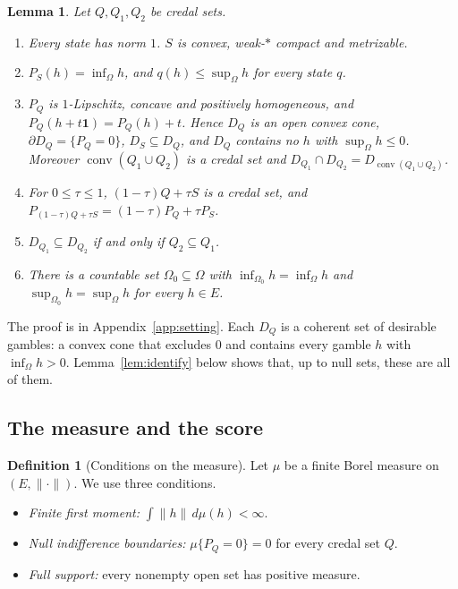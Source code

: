 \documentclass[11pt]{article}
\newcommand{\one}{\mathbf{1}}
\DeclareMathOperator{\conv}{conv}
\theoremstyle{plain}
\newtheorem{lemma}[theorem]{Lemma}
\theoremstyle{definition}
\newtheorem{definition}[theorem]{Definition}
\theoremstyle{remark}
\begin{document}
\begin{lemma}\label{lem:states}
Let $Q,Q_1,Q_2$ be credal sets.
\begin{enumerate}[label=(\alph*)]
  \item Every state has norm $1$. $S$ is convex, weak-$\ast$ compact and metrizable.
  \item $P_S(h)=\inf_\Omega h$, and $q(h)\le\sup_\Omega h$ for every state $q$.
  \item $P_Q$ is $1$-Lipschitz, concave and positively homogeneous, and $P_Q(h+t\one)=
  P_Q(h)+t$. Hence $D_Q$ is an open convex cone, $\partial D_Q=\{P_Q=0\}$, $D_S\subseteq
  D_Q$, and $D_Q$ contains no $h$ with $\sup_\Omega h\le0$. Moreover $\conv(Q_1\cup Q_2)$ is
  a credal set and $D_{Q_1}\cap D_{Q_2}=D_{\conv(Q_1\cup Q_2)}$.
  \item For $0\le\tau\le1$, $(1-\tau)Q+\tau S$ is a credal set, and $P_{(1-\tau)Q+\tau S}=
  (1-\tau)P_Q+\tau P_S$.
  \item $D_{Q_1}\subseteq D_{Q_2}$ if and only if $Q_2\subseteq Q_1$.
  \item There is a countable set $\Omega_0\subseteq\Omega$ with $\inf_{\Omega_0}h=
  \inf_\Omega h$ and $\sup_{\Omega_0}h=\sup_\Omega h$ for every $h\in E$.
\end{enumerate}
\end{lemma}

The proof is in Appendix~\ref{app:setting}. Each $D_Q$ is a coherent set of desirable
gambles: a convex cone that excludes $0$ and contains every gamble $h$ with $\inf_\Omega
h>0$. Lemma~\ref{lem:identify} below shows that, up to null sets, these are all of them.

\subsection{The measure and the score}

\begin{definition}[Conditions on the measure]\label{def:measure-conditions}
Let $\mu$ be a finite Borel measure on $(E,\|\cdot\|)$. We use three conditions.
\begin{itemize}
  \item[(M1)] \emph{Finite first moment:} $\int\|h\|\,d\mu(h)<\infty$.
  \item[(M2)] \emph{Null indifference boundaries:} $\mu\{P_Q=0\}=0$ for every credal set $Q$.
  \item[(M3)] \emph{Full support:} every nonempty open set has positive measure.
\end{itemize}
\end{definition}
\end{document}
